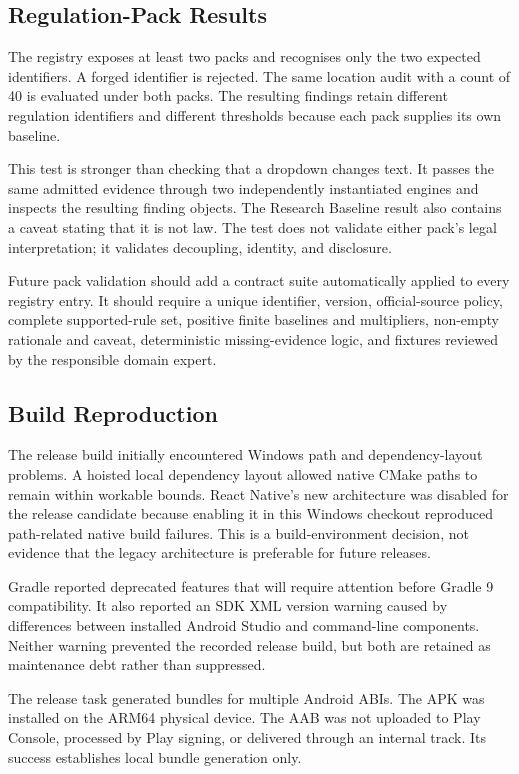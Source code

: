 \subsection{Regulation-Pack Results}

The registry exposes at least two packs and recognises only the two expected identifiers. A forged identifier is rejected. The same location audit with a count of 40 is evaluated under both packs. The resulting findings retain different regulation identifiers and different thresholds because each pack supplies its own baseline.

This test is stronger than checking that a dropdown changes text. It passes the same admitted evidence through two independently instantiated engines and inspects the resulting finding objects. The Research Baseline result also contains a caveat stating that it is not law. The test does not validate either pack's legal interpretation; it validates decoupling, identity, and disclosure.

Future pack validation should add a contract suite automatically applied to every registry entry. It should require a unique identifier, version, official-source policy, complete supported-rule set, positive finite baselines and multipliers, non-empty rationale and caveat, deterministic missing-evidence logic, and fixtures reviewed by the responsible domain expert.

\subsection{Build Reproduction}

The release build initially encountered Windows path and dependency-layout problems. A hoisted local dependency layout allowed native CMake paths to remain within workable bounds. React Native's new architecture was disabled for the release candidate because enabling it in this Windows checkout reproduced path-related native build failures. This is a build-environment decision, not evidence that the legacy architecture is preferable for future releases.

Gradle reported deprecated features that will require attention before Gradle 9 compatibility. It also reported an SDK XML version warning caused by differences between installed Android Studio and command-line components. Neither warning prevented the recorded release build, but both are retained as maintenance debt rather than suppressed.

The release task generated bundles for multiple Android ABIs. The APK was installed on the ARM64 physical device. The AAB was not uploaded to Play Console, processed by Play signing, or delivered through an internal track. Its success establishes local bundle generation only.


